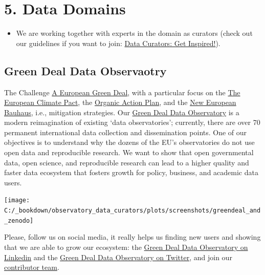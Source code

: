 \documentclass[
  a4paper,
  openany, a4paper, oneside]{book}
\providecommand{\tightlist}{%
  \setlength{\itemsep}{0pt}\setlength{\parskip}{0pt}}
\begin{document}
\hypertarget{data-domains}{%
\section*{5. Data Domains}\label{data-domains}}

\begin{itemize}
\tightlist
\item
  We are working together with experts in the domain as curators (check out our guidelines if you want to join: \href{https://curators.dataobservatory.eu/data-curators.html}{Data Curators: Get Inspired!}).
\end{itemize}

\hypertarget{green-deal-data-observaotry}{%
\subsection*{Green Deal Data Observaotry}\label{green-deal-data-observaotry}}

The Challenge \href{https://ec.europa.eu/info/strategy/priorities-2019-2024/european-green-deal_en}{A European Green Deal}, with a particular focus on the \href{https://ec.europa.eu/commission/presscorner/detail/en/ip_20_2323}{The European Climate Pact}, the \href{https://ec.europa.eu/info/food-farming-fisheries/farming/organic-farming/organic-action-plan_en}{Organic Action Plan}, and the \href{https://ec.europa.eu/commission/presscorner/detail/en/IP_21_111}{New European Bauhaus}, i.e., mitigation strategies. Our \href{http://greendeal.dataobservatory.eu/}{Green Deal Data Observatory} is a modern reimagination of existing `data observatories'; currently, there are over 70 permanent international data collection and dissemination points. One of our objectives is to understand why the dozens of the EU's observatories do not use open data and reproducible research. We want to show that open governmental data, open science, and reproducible research can lead to a higher quality and faster data ecosystem that fosters growth for policy, business, and academic data users.

\begin{center}\texttt{[image: C:/\_bookdown/observatory\_data\_curators/plots/screenshots/greendeal\_and\_zenodo]} \end{center}

Please, follow us on social media, it really helps us finding new users and showing that we are able to grow our ecosystem: the \href{https://www.linkedin.com/company/78556699}{Green Deal Data Observatory on Linkedin} and the \href{https://twitter.com/GreenDealObs}{Green Deal Data Observatory on Twitter}, and join our \href{https://greendeal.dataobservatory.eu/\#contributors}{contributor team}.
\end{document}
